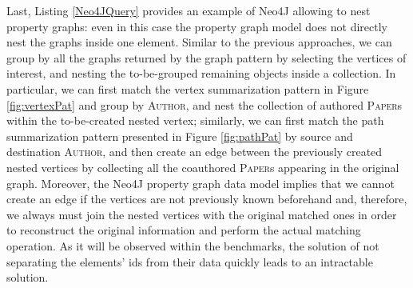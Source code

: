 Last, Listing \ref{Neo4JQuery} provides an example of Neo4J allowing to nest property graphs: even in this case the property graph model does not directly  nest the graphs inside one element. Similar to the previous approaches, we can group by all the graphs returned by the graph pattern by selecting the vertices of interest, and nesting the to-be-grouped remaining objects inside a collection. In particular, we can first match the vertex summarization pattern in Figure \ref{fig:vertexPat} and group by \textsc{Author}, and nest the collection of authored \textsc{Paper}s within the to-be-created nested vertex; similarly, we can first match the path summarization pattern presented in Figure \ref{fig:pathPat} by source and destination \textsc{Author}, and then create an edge between the previously created nested vertices by collecting all the coauthored \textsc{Paper}s appearing in the original graph. Moreover, the Neo4J property graph data model implies that we cannot create an edge if the vertices are not previously known beforehand and, therefore, we always must join the nested vertices with the original matched ones in order to reconstruct the original information and perform the actual matching operation. As it will be observed within the benchmarks, the   solution of not separating the elements' ids from their data quickly leads to an intractable solution. 